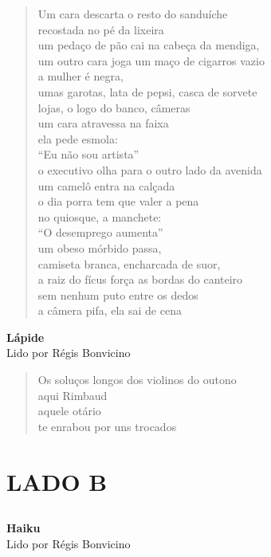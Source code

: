 \begin{verse}
Um cara descarta o resto do sanduíche\\
recostada no pé da lixeira\\
um pedaço de pão cai na cabeça da mendiga,\\
um outro cara joga um maço de cigarros vazio\\
a mulher é negra,\\
umas garotas, lata de pepsi, casca de sorvete\\
lojas, o logo do banco, câmeras\\
um cara atravessa na faixa\\
ela pede esmola:\\
``Eu não sou artista''\\
o executivo olha para o outro lado da avenida\\
um camelô entra na calçada\\
o dia porra tem que valer a pena\\
no quiosque, a manchete:\\
``O desemprego aumenta''\\
um obeso mórbido passa,\\
camiseta branca, encharcada de suor,\\
a raiz do fícus força as bordas do canteiro\\
sem nenhum puto entre os dedos\\
a câmera pifa, ela sai de cena
\end{verse}

\pagebreak

\textbf{Lápide}\\
Lido por Régis Bonvicino

\begin{verse}
Os soluços longos dos violinos do outono\\
aqui Rimbaud\\
aquele otário\\
te enrabou por uns trocados
\end{verse}


\part{LADO B}

\chapter*{}
\textbf{Haiku}\\
Lido por Régis Bonvicino

